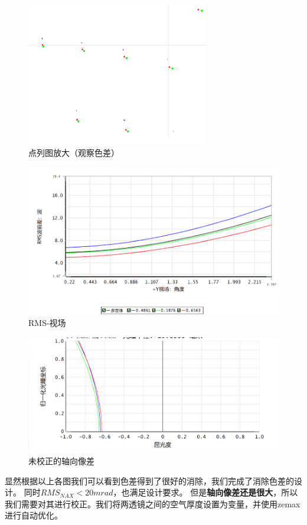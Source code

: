 \documentclass{article}
\begin{document}
    \begin{figure}[H]
      \centering
      \includegraphics[width=8cm]{img/14.png}
\caption{点列图放大（观察色差）}
                  \end{figure}

                  \begin{figure}[H]
                    \centering
                    \includegraphics[width=15cm]{img/15.png}
              \caption{RMS-视场}
                                \end{figure}
                                \begin{figure}[H]
                                  \centering
                                  \includegraphics[width=15cm]{img/16.png}
                            \caption{未校正的轴向像差}
                                              \end{figure}        
显然根据以上各图我们可以看到色差得到了很好的消除，我们完成了消除色差的设计。
同时$RMS_{NAX} < 20mrad$，也满足设计要求。
但是\textbf{轴向像差还是很大}，所以我们需要对其进行校正。我们将两透镜之间的空气厚度设置为变量，并使用zemax进行自动优化。
\end{document}
